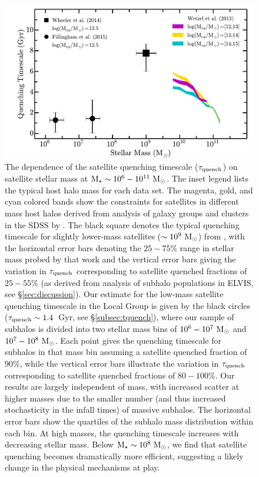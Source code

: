 \begin{figure}
\centering
\hspace*{-0.15in}
\includegraphics[width=6.5in]{ch1_f5.pdf}
\caption{The dependence of the satellite quenching timescale
  ($\tau_{\rm quench}$) on satellite stellar mass at ${\rm M}_{\star} \sim
  10^{6}-10^{11}~{\rm M}_{\odot}$. The inset legend lists the typical host halo
  mass for each data set. The magenta, gold, and cyan colored bands
  show the constraints for satellites in different mass host halos
  derived from analysis of galaxy groups and clusters in the SDSS by
  \citet{wetzel13}. The black square denotes the typical quenching
  timescale for slightly lower-mass satellites ($\sim10^{9}~{\rm M}_{\odot}$)
  from \citet{wheeler14}, with the horizontal error bars denoting the
  $25-75\%$ range in stellar mass probed by that work and the vertical
  error bars giving the variation in $\tau_{\rm quench}$ corresponding
  to satellite quenched fractions of $25-55\%$ (as derived from
  analysis of subhalo populations in ELVIS, see
  \S\ref{sec:discussion}). Our estimate for the low-mass satellite
  quenching timescale in the Local Group is given by the black circles
  ($\tau_{\rm quench} \sim 1.4$~Gyr, see \S\ref{subsec:tquench}),
  where our sample of subhalos is divided into two stellar mass bins
  of $10^{6}-10^{7}~{\rm M}_{\odot}$ and $10^{7}-10^{8}~{\rm M}_{\odot}$. Each point gives
  the quenching timescale for subhalos in that mass bin assuming a
  satellite quenched fraction of $90\%$, while the vertical error bars
  illustrate the variation in $\tau_{\rm quench}$ corresponding to
  satellite quenched fractions of $80-100\%$. Our results are largely
  independent of mass, with increased scatter at higher masses due to
  the smaller number (and thus increased stochasticity in the infall
  times) of massive subhalos. The horizontal error bars show the
  quartiles of the subhalo mass distribution within each bin. At high
  masses, the quenching timescale increases with decreasing stellar
  mass. Below ${\rm M}_{\star}\sim10^{8}~{\rm M}_{\odot}$, we find that
  satellite quenching becomes dramatically more efficient, suggesting
  a likely change in the physical mechanisms at play.}
\label{fig:tquench}
\end{figure}

